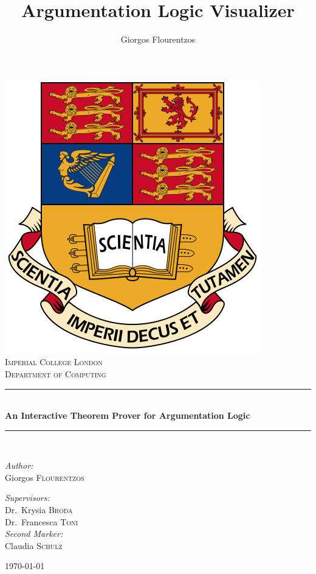 \documentclass[11pt,twoside,a4paper]{report}
\author{Giorgos Flourentzos}
\title{Argumentation Logic Visualizer}
\begin{document}
\begin{titlepage}
\begin{center}

\includegraphics[scale=0.25]{img/pimperial.png}~\\[1cm]

\textsc{\LARGE Imperial College London}\\[1.5cm]

\textsc{\Large Department of Computing}\\[0.5cm]

\rule{\linewidth}{0.5mm} \\[0.4cm]
{ \huge \bfseries An Interactive Theorem Prover for Argumentation Logic \\[0.4cm] }

\rule{\linewidth}{0.5mm} \\[1.5cm]

\begin{minipage}{0.4\textwidth}
\begin{flushleft} \large
\emph{Author:}\\
Giorgos \textsc{Flourentzos}
\end{flushleft}
\end{minipage}
\begin{minipage}{0.4\textwidth}
\begin{flushright} \large
\emph{Supervisors:} \\
Dr.~Krysia \textsc{Broda}\\
Dr.~Francesca \textsc{Toni}\\
\emph{Second Marker:} \\
Claudia \textsc{Schulz}
\end{flushright}
\end{minipage}

\vfill

{\large \today}

\end{center}
\end{titlepage}
\end{document}
